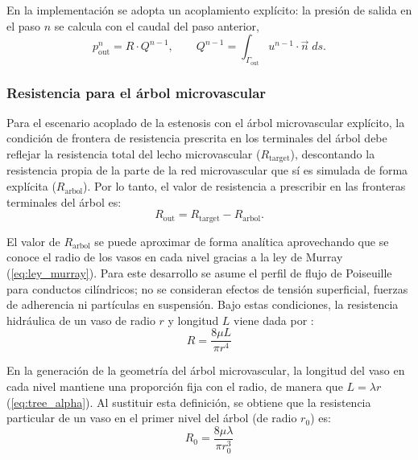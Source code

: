 \documentclass[12pt, letterpaper]{article}
\begin{document}
En la implementación se adopta un acoplamiento explícito: la presión de salida en el paso $n$ se calcula con el caudal del paso anterior,
\begin{equation}
  \label{eq:resistance_explicit}
  p_{\mathrm{out}}^n = R \cdot Q^{n-1}, \qquad Q^{n-1} = \int_{\Gamma_\mathrm{out}} u^{n-1} \cdot \vec{n} \; ds.
\end{equation}

\subsubsection{Resistencia para el árbol microvascular}

Para el escenario acoplado de la estenosis con el árbol microvascular explícito, la condición de frontera de resistencia prescrita en los terminales del árbol debe reflejar la resistencia total del lecho microvascular ($R_{\mathrm{target}}$), descontando la resistencia propia de la parte de la red microvascular que sí es simulada de forma explícita ($R_{\mathrm{arbol}}$). Por lo tanto, el valor de resistencia a prescribir en las fronteras terminales del árbol es:
\begin{equation}
  R_{\mathrm{out}} = R_{\mathrm{target}} - R_{\mathrm{arbol}}.
\end{equation}

El valor de $R_{\mathrm{arbol}}$ se puede aproximar de forma analítica aprovechando que se conoce el radio de los vasos en cada nivel gracias a la ley de Murray (\cref{eq:ley_murray}). Para este desarrollo se asume el perfil de flujo de Poiseuille para conductos cilíndricos; no se consideran efectos de tensión superficial, fuerzas de adherencia ni partículas en suspensión. Bajo estas condiciones, la resistencia hidráulica de un vaso de radio $r$ y longitud $L$ viene dada por \cite{outflow_resistance}:
\begin{equation} \label{eq:resistencia_vaso}
  R = \frac{8 \mu L}{\pi r^4}
\end{equation}

En la generación de la geometría del árbol microvascular, la longitud del vaso en cada nivel mantiene una proporción fija con el radio, de manera que $L = \lambda r$ (\cref{eq:tree_alpha}). Al sustituir esta definición, se obtiene que la resistencia particular de un vaso en el primer nivel del árbol (de radio $r_0$) es:
\begin{equation}
  R_0 = \frac{8 \mu \lambda}{\pi r_0^3}
\end{equation}
\end{document}
